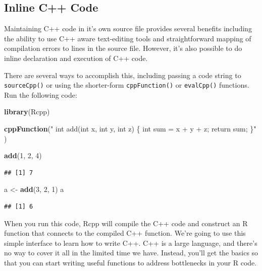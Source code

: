 \documentclass[
]{krantz}
\newenvironment{Shaded}{\begin{snugshade}}{\end{snugshade}}
\newcommand{\DecValTok}[1]{\textcolor[rgb]{0.00,0.00,0.81}{#1}}
\newcommand{\KeywordTok}[1]{\textcolor[rgb]{0.13,0.29,0.53}{\textbf{#1}}}
\newcommand{\NormalTok}[1]{#1}
\newcommand{\StringTok}[1]{\textcolor[rgb]{0.31,0.60,0.02}{#1}}
\begin{document}
\hypertarget{inline-c-code}{%
\subsection{Inline C++ Code}\label{inline-c-code}}

Maintaining C++ code in it's own source file provides several benefits including the ability to use C++ aware text-editing tools and straightforward mapping of compilation errors to lines in the source file. However, it's also possible to do inline declaration and execution of C++ code.

There are several ways to accomplish this, including passing a code string to \texttt{sourceCpp()} or using the shorter-form \texttt{cppFunction()} or \texttt{evalCpp()} functions. Run the following code:

\begin{Shaded}
\begin{Highlighting}[]
\KeywordTok{library}\NormalTok{(Rcpp)}

\KeywordTok{cppFunction}\NormalTok{(}\StringTok{"}
\StringTok{  int add(int x, int y, int z) \{}
\StringTok{    int sum = x + y + z;}
\StringTok{    return sum;}
\StringTok{  \}"}
\NormalTok{)}

\KeywordTok{add}\NormalTok{(}\DecValTok{1}\NormalTok{, }\DecValTok{2}\NormalTok{, }\DecValTok{4}\NormalTok{)}
\end{Highlighting}
\end{Shaded}

\begin{verbatim}
## [1] 7
\end{verbatim}

\begin{Shaded}
\begin{Highlighting}[]
\NormalTok{a \textless{}{-}}\StringTok{ }\KeywordTok{add}\NormalTok{(}\DecValTok{3}\NormalTok{, }\DecValTok{2}\NormalTok{, }\DecValTok{1}\NormalTok{)}
\NormalTok{a}
\end{Highlighting}
\end{Shaded}

\begin{verbatim}
## [1] 6
\end{verbatim}

When you run this code, Rcpp will compile the C++ code and construct an R function that connects to the compiled C++ function. We're going to use this simple interface to learn how to write C++. C++ is a large language, and there's no way to cover it all in the limited time we have. Instead, you'll get the basics so that you can start writing useful functions to address bottlenecks in your R code.
\end{document}
